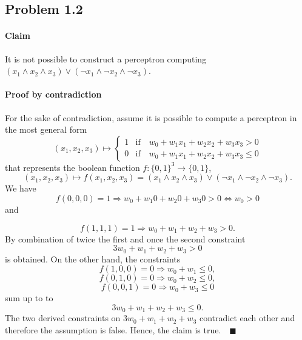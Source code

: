 \subsection*{Problem 1.2}
\paragraph{Claim}

It is not possible to construct a perceptron computing $(x_{1}\land x_{2}\land x_{3})\lor(\lnot x_{1}\land\lnot x_{2}\land\lnot x_{3})$.


\paragraph{Proof by contradiction}

For the sake of contradiction, assume it is possible to compute a
perceptron in the most general form 
\[
(x_{1},x_{2},x_{3})\mapsto\begin{cases}
1 & \text{if}\quad w_{0}+w_{1}x_{1}+w_{2}x_{2}+w_{3}x_{3}>0\\
0 & \text{if}\quad w_{0}+w_{1}x_{1}+w_{2}x_{2}+w_{3}x_{3}\leq0
\end{cases}
\]
 that represents the boolean function $f:\{0,1\}^{3}\rightarrow\{0,1\}$,
\[
(x_{1},x_{2},x_{3})\mapsto f(x_{1},x_{2},x_{3})=(x_{1}\land x_{2}\land x_{3})\lor(\lnot x_{1}\land\lnot x_{2}\land\lnot x_{3}).
\]
We have 
\[
f(0,0,0)=1\Rightarrow w_{0}+w_{1}0+w_{2}0+w_{3}0>0\Leftrightarrow w_{0}>0
\]
and

\[
f(1,1,1)=1\Rightarrow w_{0}+w_{1}+w_{2}+w_{3}>0.
\]
By combination of twice the first and once the second constraint
\[
3 w_{0}+w_{1}+w_{2}+w_{3}>0
\]
is obtained. On the other hand, the constraints
\[
f(1,0,0)=0\Rightarrow w_{0}+w_{1}\leq0,
\]
\[
f(0,1,0)=0\Rightarrow w_{0}+w_{2}\leq0,
\]
\[
f(0,0,1)=0\Rightarrow w_{0}+w_{3}\leq0
\]
sum up to to 
\[
3 w_{0}+w_{1}+w_{2}+w_{3}\leq0.
\]
 The two derived constraints on $3 w_{0}+w_{1}+w_{2}+w_{3}$ contradict
each other and therefore the assumption is false. Hence, the claim
is true.$\quad\blacksquare$
